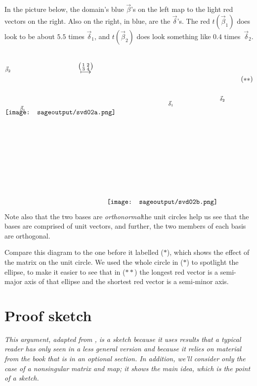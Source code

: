 In the picture below, the domain's 
blue $\vec{\beta}$'s on the left map to the light red vectors on the
right.
Also on the right, in blue, are the $\vec{\delta}$'s.
The red $t(\vec{\beta}_1)$ does look to be about $5.5$ times $\vec{\delta}_1$,
and $t(\vec{\beta}_2)$ does look something like $0.4$ times~$\vec{\delta}_2$. 
\begin{equation*}
  \setlength{\unitlength}{1in}
  \begin{picture}(1.35,1.35)
    \put(0,1.825){\texttt{[image: sageoutput/svd02a.png]}}
    \put(.3,1.9){\scriptsize $\vec{\beta}_1$}
    \put(0,2.7){\scriptsize $\vec{\beta}_2$}
  \end{picture}
  \quad
  \raisebox{2.65in}{$\mapsunder{\big (\begin{smallmatrix} 1 &2 \\ 3 &4 \end{smallmatrix}\big )}$}
  \qquad
  \begin{picture}(2.45,3.15)
    \put(0,0){\texttt{[image: sageoutput/svd02b.png]}}
    \put(1.25,2){\scriptsize $\vec{\delta}_1$}
    \put(2.3,2.1){\scriptsize $\vec{\delta}_2$}
  \end{picture}
  \tag*{\raisebox{2.5in}{($**$)}}
\end{equation*}
Note also that the two bases are \textit{orthonormal}\Dash the unit circles help
us see that the bases are comprised of unit vectors, and further,
the two members of each basis are orthogonal.

Compare this diagram to the one before it 
labelled ($*$), which shows the effect of the matrix
on the unit circle.
We used the whole circle in ($*$) to spotlight the ellipse, 
to make it easier to see that in ($**$)
the longest red vector is a
semi-major axis of that ellipse and the shortest red vector is a 
semi-minor axis.


\section{Proof sketch}

\textit{This argument, 
adapted from \cite{BlankKrikorianSpring89},
is a sketch because it uses results that a typical reader has only 
seen in a less general version and because it relies on material from the
book that is in an optional section.
In addition, we'll consider only the case of a nonsingular matrix and map;
it shows the main idea, which is the point of a sketch.}

